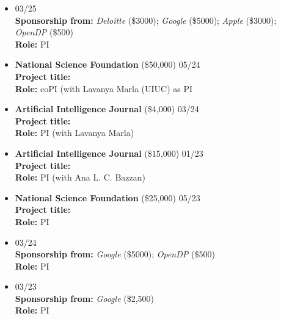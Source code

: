 
\begin{itemize}
	\item {} \hfill\textsc{03/25}\\
	{\bf Sponsorship from:} 
	\textit{Deloitte} {(\$3000)};
	\textit{Google} {(\$5000)}; 
	\textit{Apple} {(\$3000)};
	\textit{OpenDP} {(\$500)}\\
	{\bf Role:} PI

	\item
	\textbf{National Science Foundation}
	{(\$50,000)} \hfill\textsc{05/24}\\
	{\bf Project title:} \\
	{\bf Role:} coPI (with Lavanya Marla (\textsc{UIUC}) as PI

	\item
	\textbf{Artificial Intelligence Journal}
	{(\$4,000)} \hfill\textsc{03/24}\\
	{\bf Project title:} \\
	{\bf Role:} PI {(with Lavanya Marla)}
	
	\item
	\textbf{Artificial Intelligence Journal}
	({\$15,000}) \hfill\textsc{01/23}\\
	{\bf Project title:} \\
	{\bf Role: } PI (with Ana L. C. Bazzan)

	\item
	\textbf{National Science Foundation}
	{(\$25,000)}
	\hfill\textsc{05/23}\\
	{\bf Project title:} \\
	{\bf Role:} PI

	\item {} \hfill\textsc{03/24}\\
	{\bf Sponsorship from:} 
	\textit{Google} {(\$5000)}; 
	\textit{OpenDP} {(\$500)}\\
	{\bf Role:} PI

	\item {} \hfill\textsc{03/23}\\
	{\bf Sponsorship from:} 
	\textit{Google} {(\$2,500)}\\
	{\bf Role:} PI
\end{itemize}

